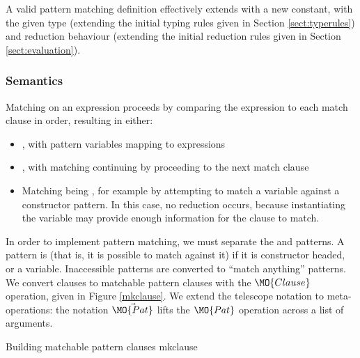 A valid pattern matching definition effectively extends \TT{} with a new constant,
with the given type (extending the initial typing rules given in Section \ref{sect:typerules})
and reduction behaviour (extending the initial reduction rules given in Section
\ref{sect:evaluation}). 

\subsubsection{Semantics}

Matching on an expression proceeds by comparing the expression to
each match clause in order, resulting in either:

\begin{itemize}
\item {}, with pattern variables mapping to expressions
\item {}, with matching continuing by proceeding to the next match clause
\item Matching being , for example by attempting to match a variable
against a constructor pattern. In this case, no reduction occurs, because instantiating
the variable may provide enough information for the clause to match.
\end{itemize}


In order to implement pattern matching, we must separate the  and
 patterns. A pattern is  (that is, it is possible
to match against it) if it is constructor headed, or a variable. Inaccessible patterns
are converted to ``match anything'' patterns. We convert clauses to matchable pattern
clauses with the $\MO{Clause}$ operation, given in Figure \ref{mkclause}.
We extend the telescope notation to meta-operations: the notation $\vec{\MO{Pat}}$ lifts the
$\MO{Pat}$ operation across a list of arguments.

{Building matchable pattern clauses}
{mkclause}


